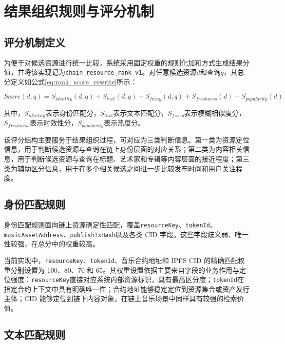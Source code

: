 \section{结果组织规则与评分机制}

\subsection{评分机制定义}

为便于对候选资源进行统一比较，系统采用固定权重的规则化加和方式生成结果分值，并将该实现记为\texttt{chain\_resource\_rank\_v1}。对任意候选资源$d$和查询$q$，其总分定义如公式\eqref{eq:rank_score_rewrite}所示：

\begin{equation}
    Score(d,q)=S_{identity}(d,q)+S_{text}(d,q)+S_{fuzzy}(d,q)+S_{freshness}(d)+S_{popularity}(d)
    \label{eq:rank_score_rewrite}
\end{equation}

其中，$S_{identity}$表示身份匹配分，$S_{text}$表示文本匹配分，$S_{fuzzy}$表示模糊相似度分，$S_{freshness}$表示时效性分，$S_{popularity}$表示热度分。

该评分结构主要服务于结果组织过程，可对应为三类判断信息。第一类为资源定位信息，用于判断候选资源与查询在链上身份层面的对应关系；第二类为内容相关信息，用于判断候选资源与查询在标题、艺术家和专辑等内容层面的接近程度；第三类为辅助区分信息，用于在多个相关候选之间进一步比较发布时间和用户关注程度。

\subsection{身份匹配规则}

身份匹配规则面向链上资源确定性匹配，覆盖\texttt{resourceKey}、\texttt{tokenId}、\texttt{musicAssetAddress}、\texttt{publishTxHash}以及各类 CID 字段。这些字段歧义弱、唯一性较强，在总分中的权重较高。

当前实现中，\texttt{resourceKey}、\texttt{tokenId}、音乐合约地址和 IPFS CID 的精确匹配权重分别设置为 100、80、70 和 65。其权重设置依据主要来自字段的业务作用与定位强度：\texttt{resourceKey}直接对应系统内部资源标识，具有最高区分度；\texttt{tokenId}在指定合约上下文中具有明确唯一性；合约地址能够稳定定位到资源集合或资产发行主体；CID 能够定位到链下内容对象，在链上音乐场景中同样具有较强的检索价值。

\subsection{文本匹配规则}

